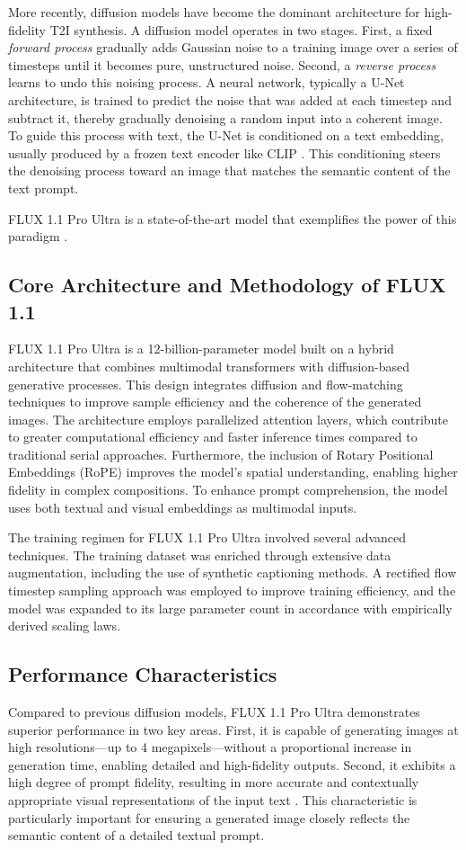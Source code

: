 More recently, diffusion models have become the dominant architecture for high-fidelity T2I synthesis. A diffusion model operates in two stages. First, a fixed \textit{forward process} gradually adds Gaussian noise to a training image over a series of timesteps until it becomes pure, unstructured noise. Second, a \textit{reverse process} learns to undo this noising process. A neural network, typically a U-Net architecture, is trained to predict the noise that was added at each timestep and subtract it, thereby gradually denoising a random input into a coherent image. To guide this process with text, the U-Net is conditioned on a text embedding, usually produced by a frozen text encoder like CLIP \cite{radford2021learning}. This conditioning steers the denoising process toward an image that matches the semantic content of the text prompt.

FLUX 1.1 Pro Ultra is a state-of-the-art model that exemplifies the power of this paradigm \cite{blackforestlabs2024flux}.

\subsection{Core Architecture and Methodology of FLUX 1.1}
FLUX 1.1 Pro Ultra is a 12-billion-parameter model built on a hybrid architecture that combines multimodal transformers with diffusion-based generative processes. This design integrates diffusion and flow-matching techniques to improve sample efficiency and the coherence of the generated images. The architecture employs parallelized attention layers, which contribute to greater computational efficiency and faster inference times compared to traditional serial approaches. Furthermore, the inclusion of Rotary Positional Embeddings (RoPE) improves the model's spatial understanding, enabling higher fidelity in complex compositions. To enhance prompt comprehension, the model uses both textual and visual embeddings as multimodal inputs.

The training regimen for FLUX 1.1  Pro Ultra involved several advanced techniques. The training dataset was enriched through extensive data augmentation, including the use of synthetic captioning methods. A rectified flow timestep sampling approach was employed to improve training efficiency, and the model was expanded to its large parameter count in accordance with empirically derived scaling laws.

\subsection{Performance Characteristics}
Compared to previous diffusion models, FLUX 1.1 Pro Ultra demonstrates superior performance in two key areas. First, it is capable of generating images at high resolutions—up to 4 megapixels—without a proportional increase in generation time, enabling detailed and high-fidelity outputs. Second, it exhibits a high degree of prompt fidelity, resulting in more accurate and contextually appropriate visual representations of the input text \cite{blackforestlabs2024flux}. This characteristic is particularly important for ensuring a generated image closely reflects the semantic content of a detailed textual prompt.
